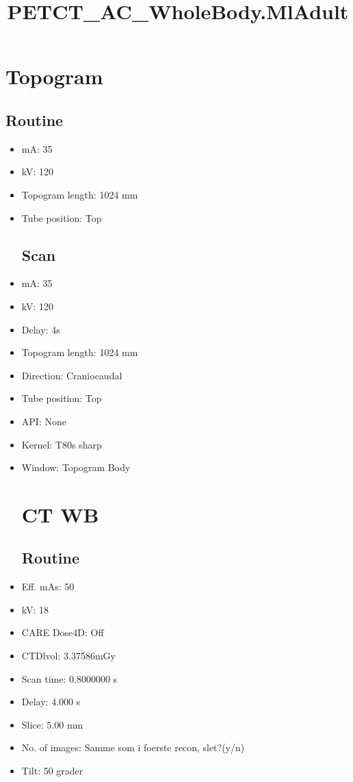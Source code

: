 \documentclass[12pt]{article}
\title{PETCT\_AC\_WholeBody.MlAdult}
\begin{document}
\maketitle
\newpage
\tableofcontents
\newpage
{}


\section{Topogram}
\subsection{Routine}
 \begin{itemize}\item mA: 35\item kV: 120\item Topogram length: 1024 mm\item Tube position: Top
\subsection{Scan}
\item mA: 35\item kV: 120\item Delay: 4s\item Topogram length: 1024 mm\item Direction: Craniocaudal\item Tube position: Top\item API: None\item Kernel: T80s sharp\item Window: Topogram Body
\section{CT WB}
\subsection{Routine}
\item Eff. mAs: 50\item kV: 18\item CARE Dose4D: Off\item CTDlvol: 3.37586mGy\item Scan time: 0.8000000 s\item Delay: 4.000 s\item Slice: 5.00 mm\item No. of images: Samme som i foerste recon, slet?(y/n)\item Tilt: 50 grader

\end{itemize}
\end{document}
